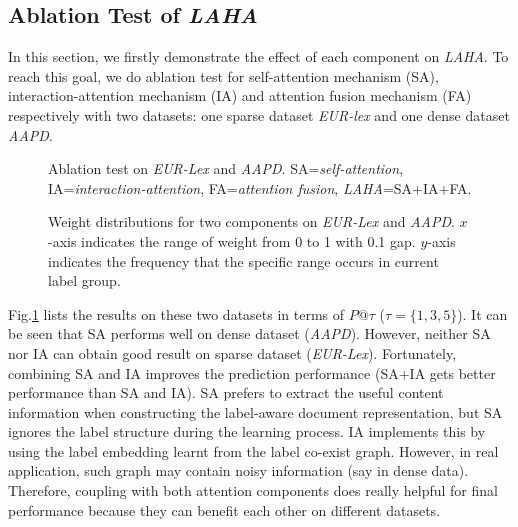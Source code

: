 \documentclass[runningheads]{llncs}
\begin{document}
\subsection{Ablation Test of \textit{LAHA}}
In this section, we firstly
demonstrate the effect of each component on \textit{LAHA}. To reach this goal, we do ablation test for self-attention mechanism (SA), interaction-attention mechanism (IA) and attention fusion mechanism (FA) respectively with two datasets: one sparse dataset \textit{EUR-lex} and one dense dataset \textit{AAPD}.
\vspace{-2mm}
\begin{figure}[h]
	\centering
	\setlength{\abovecaptionskip}{0.cm}
	\setlength{\belowcaptionskip}{-0.cm}
	\caption{Ablation test on \textit{EUR-Lex} and \textit{AAPD}. SA=\textit{self-attention}, IA=\textit{interaction-attention}, FA=\textit{attention fusion}, \textit{LAHA}=SA+IA+FA. }\label{Fig:lablation-test} 
\end{figure}


\begin{figure}[h]\centering
\setlength{\abovecaptionskip}{0.cm}
	\setlength{\belowcaptionskip}{-0.cm}	
	\caption{Weight distributions for two components on \textit{EUR-Lex} and \textit{AAPD}. $x$-axis indicates the range of weight from 0 to 1 with 0.1 gap. $y$-axis indicates the frequency that the specific range occurs in current label group.} \label{Fig:weight-distribution}
\end{figure}

Fig.\ref{Fig:lablation-test} lists the results on these two datasets in terms of $P@\tau$ ($\tau=\{1,3,5\}$). It can be seen that SA performs well on dense dataset (\textit{AAPD}). However, neither SA nor IA can obtain good result on sparse dataset (\textit{EUR-Lex}). Fortunately, combining SA and IA improves the prediction performance (SA+IA gets better performance than SA and IA). SA prefers to extract the useful content information when constructing the label-aware document representation, but SA ignores the label structure during the learning process. IA implements this by using the label embedding learnt from the label co-exist graph. However, in real application, such graph may contain noisy information (say in dense data). Therefore, coupling with both attention components does really helpful for final performance because they can benefit each other on different datasets.
\end{document}
